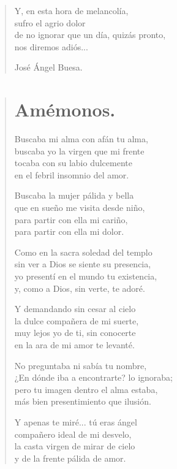 \documentclass[11pt, portrait, twoside, notitlepage, openright]{book}
\begin{document}
\begin{verse}
Y, en esta hora de melancolía,\\
sufro el agrio dolor\\
de no ignorar que un día, quizás pronto,\\
nos diremos adiós...
\newline

José Ángel Buesa.
\end{verse}

\newpage
\begin{verse}
\begin{center}
\section{Amémonos.}
\end{center}
Buscaba mi alma con afán tu alma,\\
buscaba yo la virgen que mi frente\\
tocaba con su labio dulcemente\\
en el febril insomnio del amor.
\newline

Buscaba la mujer pálida y bella\\
que en sueño me visita desde niño,\\
para partir con ella mi cariño,\\
para partir con ella mi dolor.
\newline

Como en la sacra soledad del templo\\
sin ver a Dios se siente su presencia,\\
yo presentí en el mundo tu existencia,\\
y, como a Dios, sin verte, te adoré.
\newline

Y demandando sin cesar al cielo\\
la dulce compañera de mi suerte,\\
muy lejos yo de ti, sin conocerte\\
en la ara de mi amor te levanté.
\newline

No preguntaba ni sabía tu nombre,\\
¿En dónde iba a encontrarte? lo ignoraba;\\
pero tu imagen dentro el alma estaba,\\
más bien presentimiento que ilusión.
\newpage

Y apenas te miré... tú eras ángel\\
compañero ideal de mi desvelo,\\
la casta virgen de mirar de cielo\\
y de la frente pálida de amor.
\newline


\end{verse}
\end{document}
